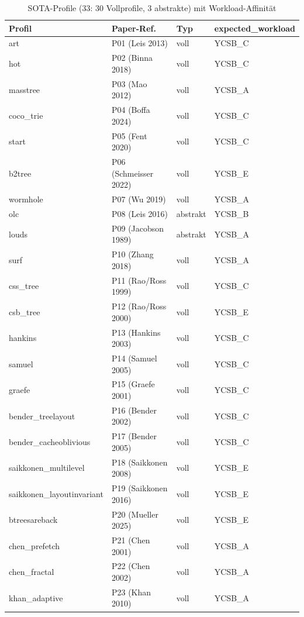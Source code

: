 \begin{nurlang}
\begin{table}[!htbp]
  \caption{SOTA-Profile (33: 30 Vollprofile, 3 abstrakte) mit Workload-Affinität}\label{tab:sota-profiles}
  \centering\small
  \begin{tabular}{llll}
    \toprule
    \textbf{Profil} & \textbf{Paper-Ref.} & \textbf{Typ} & \textbf{expected\_workload} \\
    \midrule
    art & P01 (Leis 2013) & voll & YCSB\_C \\
    hot & P02 (Binna 2018) & voll & YCSB\_C \\
    masstree & P03 (Mao 2012) & voll & YCSB\_A \\
    coco\_trie & P04 (Boffa 2024) & voll & YCSB\_C \\
    start & P05 (Fent 2020) & voll & YCSB\_C \\
    b2tree & P06 (Schmeisser 2022) & voll & YCSB\_E \\
    wormhole & P07 (Wu 2019) & voll & YCSB\_A \\
    olc & P08 (Leis 2016) & abstrakt & YCSB\_B \\
    louds & P09 (Jacobson 1989) & abstrakt & YCSB\_A \\
    surf & P10 (Zhang 2018) & voll & YCSB\_A \\
    css\_tree & P11 (Rao/Ross 1999) & voll & YCSB\_C \\
    csb\_tree & P12 (Rao/Ross 2000) & voll & YCSB\_E \\
    hankins & P13 (Hankins 2003) & voll & YCSB\_C \\
    samuel & P14 (Samuel 2005) & voll & YCSB\_C \\
    graefe & P15 (Graefe 2001) & voll & YCSB\_C \\
    bender\_treelayout & P16 (Bender 2002) & voll & YCSB\_C \\
    bender\_cacheoblivious & P17 (Bender 2005) & voll & YCSB\_C \\
    saikkonen\_multilevel & P18 (Saikkonen 2008) & voll & YCSB\_E \\
    saikkonen\_layoutinvariant & P19 (Saikkonen 2016) & voll & YCSB\_E \\
    btreesareback & P20 (Mueller 2025) & voll & YCSB\_E \\
    chen\_prefetch & P21 (Chen 2001) & voll & YCSB\_A \\
    chen\_fractal & P22 (Chen 2002) & voll & YCSB\_A \\
    khan\_adaptive & P23 (Khan 2010) & voll & YCSB\_A \\

\end{tabular}
\end{table}
\end{nurlang}

